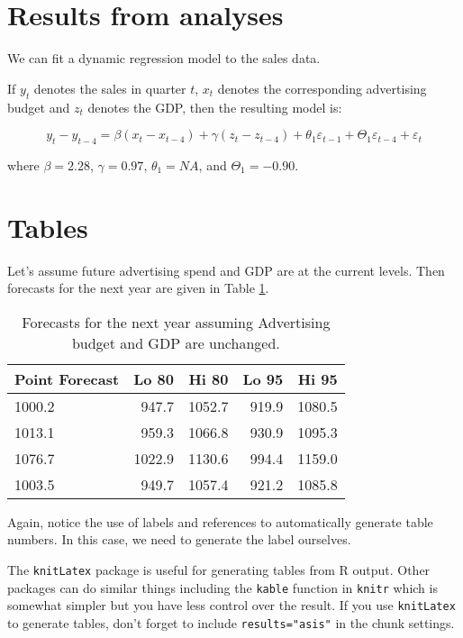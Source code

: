 \documentclass{monashthesis}
\begin{document}
\section{Results from analyses}\label{results-from-analyses}

We can fit a dynamic regression model to the sales data.

If \(y_t\) denotes the sales in quarter \(t\), \(x_t\) denotes the
corresponding advertising budget and \(z_t\) denotes the GDP, then the
resulting model is:

\begin{equation}
  y_t - y_{t-4} = \beta (x_t-x_{t-4}) + \gamma (z_t-z_{t-4}) + \theta_1 \varepsilon_{t-1} + \Theta_1 \varepsilon_{t-4} + \varepsilon_t
\end{equation}

where \(\beta = 2.28\), \(\gamma = 0.97\), \(\theta_1 = NA\), and
\(\Theta_1 = -0.90\).

\section{Tables}\label{tables}

Let's assume future advertising spend and GDP are at the current levels.
Then forecasts for the next year are given in Table
\ref{tab:salesforecasts}.

\begin{table}[ht]
\begin{center}
\begin{tabular}{lrrrr}
\toprule
Point Forecast & Lo 80 & Hi 80 & Lo 95 & Hi 95 \\
\midrule
1000.2 &  947.7 & 1052.7 & 919.9 & 1080.5 \\
1013.1 &  959.3 & 1066.8 & 930.9 & 1095.3 \\
1076.7 & 1022.9 & 1130.6 & 994.4 & 1159.0 \\
1003.5 &  949.7 & 1057.4 & 921.2 & 1085.8 \\
\bottomrule
\end{tabular}
\caption{Forecasts for the next year assuming Advertising budget and GDP are unchanged.}
\label{tab:salesforecasts}
\end{center}
\end{table}

Again, notice the use of labels and references to automatically generate
table numbers. In this case, we need to generate the label ourselves.

The \texttt{knitLatex} package is useful for generating tables from R
output. Other packages can do similar things including the
\texttt{kable} function in \texttt{knitr} which is somewhat simpler but
you have less control over the result. If you use \texttt{knitLatex} to
generate tables, don't forget to include \texttt{results="asis"} in the
chunk settings.
\end{document}
